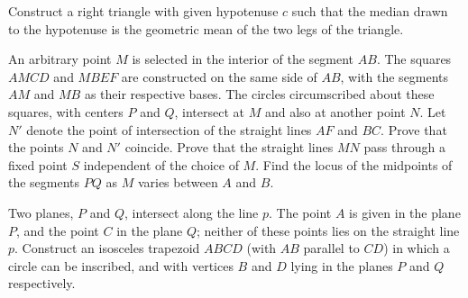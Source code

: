 \begin{exercise}[4/1959]
    Construct a right triangle with given hypotenuse $c$ such that the median drawn to the hypotenuse is the geometric mean of the two legs of the triangle.
\end{exercise}

\begin{exercise}[5/1959]
    An arbitrary point $M$ is selected in the interior of the segment $AB$.
    The squares $AMCD$ and $MBEF$ are constructed on the same side of $AB$, with the segments $AM$ and $MB$ as their respective bases.
    The circles circumscribed about these squares, with centers $P$ and $Q$, intersect at $M$ and also at another point $N$.
    Let $N'$ denote the point of intersection of the straight lines $AF$ and $BC$.
    Prove that the points $N$ and $N'$ coincide.
    Prove that the straight lines $MN$ pass through a fixed point $S$ independent of the choice of $M$.
    Find the locus of the midpoints of the segments $PQ$ as $M$ varies between $A$ and $B$.
\end{exercise}

\begin{exercise}[6/1959]
    Two planes, $P$ and $Q$, intersect along the line $p$.
    The point $A$ is given in the plane $P$, and the point $C$ in the plane $Q$;
    neither of these points lies on the straight line $p$.
    Construct an isosceles trapezoid $ABCD$ (with $AB$ parallel to $CD$) in which a circle can be inscribed, and with vertices $B$ and $D$ lying in the planes $P$ and $Q$ respectively.
\end{exercise}